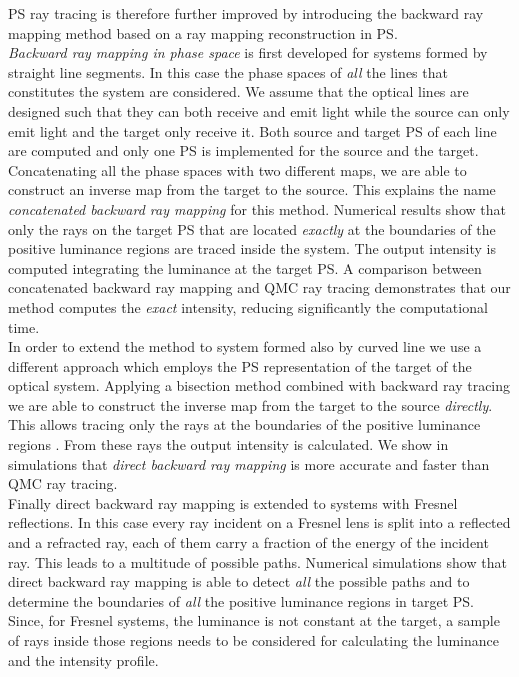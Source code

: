 PS ray tracing is therefore further improved by introducing the backward ray mapping method based on a ray mapping reconstruction in PS. 
\\ \indent\textit{Backward ray mapping in phase space} is first developed for systems formed by straight line segments. In this case the phase spaces of \textit{all} the lines that constitutes the system are considered. We assume that the optical lines are designed such that they can both receive and emit light while the source can only emit light and the target only receive it. Both source and target PS of each line are computed and only one PS is implemented for the source and the target. Concatenating all the phase spaces with two different maps, we are able to construct an inverse map from the target to the source. This explains the name \textit{concatenated backward ray mapping} for this method. Numerical results show that only the rays on the target PS that are located \textit{exactly} at the boundaries of the positive luminance regions are traced inside the system. The output intensity is computed integrating the luminance at the target PS. A comparison between concatenated backward ray mapping and QMC ray tracing demonstrates that our method computes the \textit{exact} intensity, reducing significantly the computational time. \\ \indent In order to extend the method to system formed also by curved line we use a different approach which employs the PS representation of the target of the optical system. Applying a bisection method combined with backward ray tracing we are able to construct the inverse map from the target to the source \textit{directly}. This allows tracing only the rays at the boundaries of the positive luminance regions \cite{filosa2017inverse}. From these rays the output intensity is calculated. We show in simulations that \textit{direct backward ray mapping} is more accurate and faster than QMC ray tracing. \\ \indent Finally direct backward ray mapping is extended to systems with Fresnel reflections. In this case every ray incident on a Fresnel lens is split into a reflected and a refracted ray, each of them carry a fraction of the energy of the incident ray. This leads to a multitude of possible paths. 
Numerical simulations show that direct backward ray mapping is able to detect \textit{all} the possible paths and to determine the boundaries of \textit{all} the positive luminance regions in target PS. Since, for Fresnel systems, the luminance is not constant at the target, a sample of rays inside those regions needs to be considered for calculating the luminance and the intensity profile.
